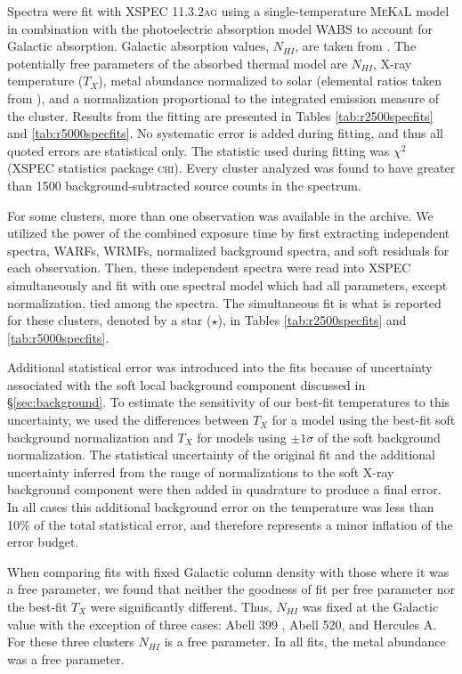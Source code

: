 \documentclass[12pt,preprint]{aastex}
\begin{document}
Spectra were fit with {\textsc{XSPEC 11.3.2ag}} \citep{1996ASPC..101...17A}
using a single-temperature {\textsc{MeKaL}} model in combination with the
photoelectric absorption model {\textsc{WABS}} \citep{1983ApJ...270..119M}
to account for Galactic absorption. Galactic absorption values,
$N_{HI}$, are taken from \cite{1990ARA&A..28..215D}. The potentially
free parameters of the absorbed thermal model are
$N_{HI}$, X-ray temperature ($T_{X}$), metal abundance normalized to solar
(elemental ratios taken from \citealt{1989GeCoA..53..197A}), and a
normalization proportional to the integrated emission measure of the
cluster. Results from the fitting are presented in Tables
\ref{tab:r2500specfits} and \ref{tab:r5000specfits}. No
systematic error is added during fitting, and thus all quoted errors
are statistical only. The statistic used during fitting was $\chi^2$
({\textsc{XSPEC}} statistics package \textsc{chi}). Every cluster
analyzed was found to have greater than 1500 background-subtracted
source counts in the spectrum.

For some clusters, more than one observation was available in the
archive. We utilized the power of the combined exposure time by first
extracting independent spectra, WARFs, WRMFs, normalized background
spectra, and soft residuals for each observation. Then, these
independent spectra were read into \textsc{XSPEC} simultaneously and
fit with one spectral model which had all parameters, except
normalization, tied among the spectra. The simultaneous fit is what is
reported for these clusters, denoted by a star ($\star$), in Tables
\ref{tab:r2500specfits} and \ref{tab:r5000specfits}.

Additional statistical error was introduced into the fits because of
uncertainty associated with the soft local background component
discussed in \S\ref{sec:background}. To estimate the sensitivity of
our best-fit temperatures to this uncertainty, we used the differences
between $T_{X}$ for a model using the best-fit soft background
normalization and $T_{X}$ for models using $\pm1\sigma$ of the soft
background normalization. The statistical uncertainty of the original
fit and the additional uncertainty inferred from the range of
normalizations to the soft X-ray background component were then added
in quadrature to produce a final error. In all cases this additional
background error on the temperature was less than 10\% of the total
statistical error, and therefore represents a minor inflation of the
error budget.

When comparing fits with fixed Galactic column density with those
where it was a free parameter, we found that neither the goodness of
fit per free parameter nor the best-fit $T_{X}$ were significantly
different. Thus, $N_{HI}$ was fixed at the Galactic value with the
exception of three cases: Abell 399 \citep{2004MNRAS.351.1439S}, Abell
520, and Hercules A. For these three clusters $N_{HI}$ is a free
parameter. In all fits, the metal abundance was a free parameter.
\end{document}

